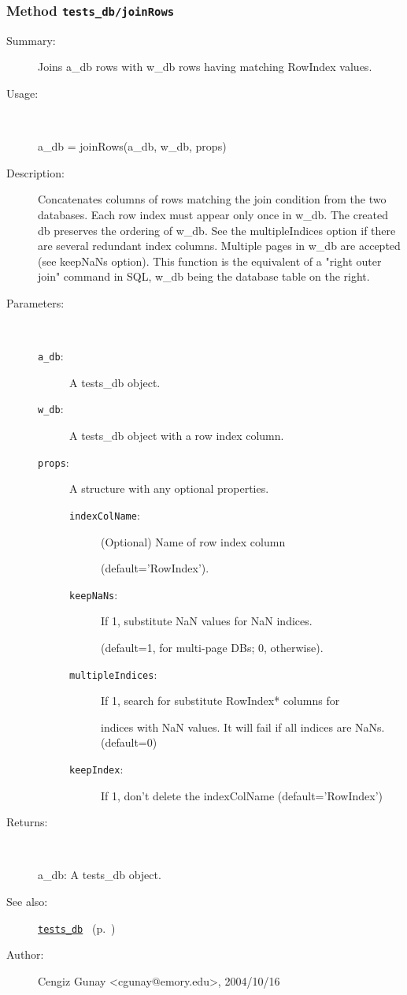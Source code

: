 \subsubsection[Method \texttt{joinRows}]{Method \texttt{tests\_db/joinRows}}%
%
\label{ref_tests_db__joinRows}%
\hypertarget{ref_tests_db__joinRows}{}%
\begin{description}
\item[Summary:]Joins a\_db rows with w\_db rows having matching RowIndex values.
%
\item[Usage:]~%
\begin{lyxcode}%
a\_db = joinRows(a\_db, w\_db, props)
%
\end{lyxcode}%
%
\item[Description:]%
Concatenates columns of rows matching the join condition from the two
 databases. Each row index must appear only once in w\_db. The created db
 preserves the ordering of w\_db. See the multipleIndices option if there
 are several redundant index columns. Multiple pages in w\_db are accepted
 (see keepNaNs option).
   This function is the equivalent of a "right outer join" command in SQL, w\_db
 being the database table on the right.
\item[Parameters:]~
\begin{description}%
\item[\texttt{a\_db}:]
 A tests\_db object.
\item[\texttt{w\_db}:]
 A tests\_db object with a row index column.
\item[\texttt{props}:]
 A structure with any optional properties.
\begin{description}%
\item[\texttt{indexColName}:]
 (Optional) Name of row index column

(default='RowIndex').
\item[\texttt{keepNaNs}:]
 If 1, substitute NaN values for NaN indices. 

(default=1, for multi-page DBs; 0, otherwise).
\item[\texttt{multipleIndices}:]
 If 1, search for substitute RowIndex* columns for

indices with NaN values. It will fail if all indices are
NaNs. (default=0)
\item[\texttt{keepIndex}:]
 If 1, don't delete the indexColName (default='RowIndex')
\end{description}%
\end{description}%
%
\item[Returns:
]~

	a\_db: A tests\_db object.
%
%
\item[See also:]%
\hyperlink{ref_tests_db}{\texttt{tests\_db}}%
\ (p.~\pageref{ref_tests_db})%
%
%
\item[Author:]%
Cengiz Gunay <cgunay@emory.edu>, 2004/10/16
%
\end{description}
\methodline%
